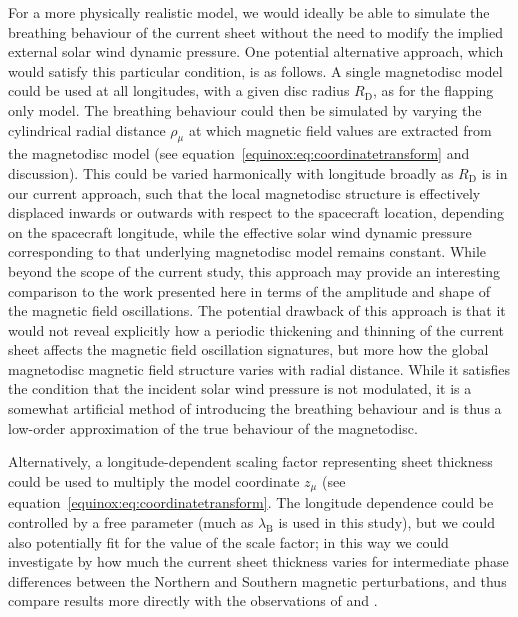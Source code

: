 For a more physically realistic model, we would ideally be able to simulate the breathing behaviour of the current sheet without the need to modify the implied external solar wind dynamic pressure. One potential alternative approach, which would satisfy this particular condition, is as follows. A single magnetodisc model could be used at all longitudes, with a given disc radius $R_\mathrm{D}$, as for the flapping only model. The breathing behaviour could then be simulated by varying the cylindrical radial distance $\rho_\mu$ at which magnetic field values are extracted from the magnetodisc model (see equation~\ref{equinox:eq:coordinatetransform} and discussion). This could be varied harmonically with longitude broadly as $R_\mathrm{D}$ is in our current approach, such that the local magnetodisc structure is effectively displaced inwards or outwards with respect to the spacecraft location, depending on the spacecraft longitude, while the effective solar wind dynamic pressure corresponding to that underlying magnetodisc model remains constant. While beyond the scope of the current study, this approach may provide an interesting comparison to the work presented here in terms of the amplitude and shape of the magnetic field oscillations. The potential drawback of this approach is that it would not reveal explicitly how a periodic thickening and thinning of the current sheet affects the magnetic field oscillation signatures, but more how the global magnetodisc magnetic field structure varies with radial distance. While it satisfies the condition that the incident solar wind pressure is not modulated, it is a somewhat artificial method of introducing the breathing behaviour and is thus a low-order approximation of the true behaviour of the magnetodisc. 

Alternatively, a longitude-dependent scaling factor representing sheet thickness could be used to multiply the model coordinate $z_\mu$ (see equation~\ref{equinox:eq:coordinatetransform}. The longitude dependence could be controlled by a free parameter (much as $\lambda_\mathrm{B}$ is used in this study), but we could also potentially fit for the value of the scale factor; in this way we could investigate by how much the current sheet thickness varies for intermediate phase differences between the Northern and Southern magnetic perturbations, and thus compare results more directly with the observations of \citep{provan2012} and \citep{cowley2017b}. 

